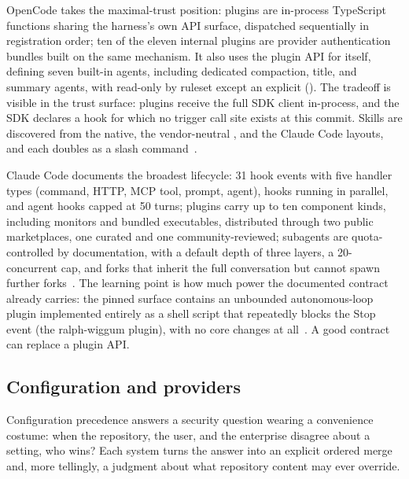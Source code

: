 \documentclass{article}
\newcommand{\occ}[0]{OpenCode}
\newcommand{\ccc}[0]{Claude Code}
\begin{document}
\occ{} takes the maximal-trust position: plugins are in-process
TypeScript functions sharing the harness's own API surface, dispatched
sequentially in registration order; ten of the eleven internal plugins
are provider authentication bundles built on the same mechanism. It also
uses the plugin API for itself, defining seven built-in agents, including
dedicated compaction, title, and summary agents, with 
read-only by ruleset except an explicit 
(). The tradeoff is visible in the trust surface:
plugins receive the full SDK client in-process, and the SDK declares a
 hook for which no trigger call site exists at this
commit. Skills are discovered from the native, the vendor-neutral
, and the \ccc{}  layouts, and each doubles
as a slash command~\citep{opencodeRepo,opencodeDocs}.

\ccc{} documents the broadest lifecycle: 31 hook events with five handler
types (command, HTTP, MCP tool, prompt, agent), hooks running in
parallel, and agent hooks capped at 50 turns; plugins carry up to ten
component kinds, including monitors and bundled executables, distributed
through two public marketplaces, one curated and one community-reviewed;
subagents are quota-controlled by documentation, with a default depth of
three layers, a 20-concurrent cap, and forks that inherit the full
conversation but cannot spawn further
forks~\citep{claudeCodeDocsHooks,claudeCodeDocsPlugins,%
claudeCodeDocsSubagents}. The learning point is how much power the
documented contract already carries: the pinned surface contains an
unbounded autonomous-loop plugin implemented entirely as a shell script
that repeatedly blocks the Stop event (the ralph-wiggum plugin), with no
core changes at all~\citep{claudeCodePluginSurface}. A good contract can replace
a plugin API.

\subsection{Configuration and providers}
\label{sec:config}

Configuration precedence answers a security question wearing a
convenience costume: when the repository, the user, and the enterprise
disagree about a setting, who wins? Each system turns the answer into an
explicit ordered merge and, more tellingly, a judgment about what
repository content may ever override.
\end{document}
